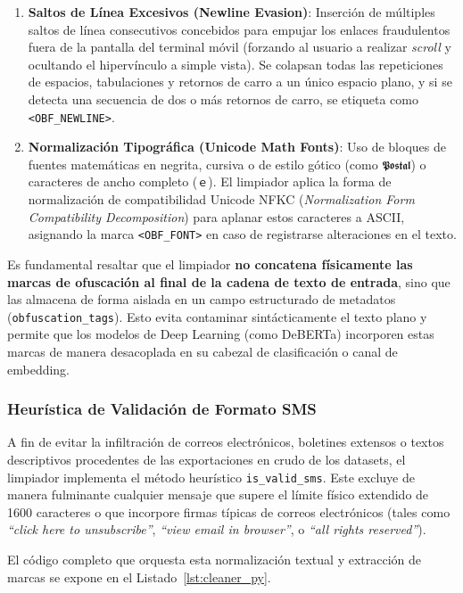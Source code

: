 \begin{enumerate}
    \item \textbf{Saltos de Línea Excesivos (Newline Evasion)}: Inserción de múltiples saltos de línea consecutivos concebidos para empujar los enlaces fraudulentos fuera de la pantalla del terminal móvil (forzando al usuario a realizar \textit{scroll} y ocultando el hipervínculo a simple vista). Se colapsan todas las repeticiones de espacios, tabulaciones y retornos de carro a un único espacio plano, y si se detecta una secuencia de dos o más retornos de carro, se etiqueta como \texttt{<OBF\_NEWLINE>}.
    \item \textbf{Normalización Tipográfica (Unicode Math Fonts)}: Uso de bloques de fuentes matemáticas en negrita, cursiva o de estilo gótico (como \texttt{𝕻𝖔𝖘𝖙𝖆𝖑}) o caracteres de ancho completo (\texttt{ｅ}). El limpiador aplica la forma de normalización de compatibilidad Unicode NFKC (\textit{Normalization Form Compatibility Decomposition}) para aplanar estos caracteres a ASCII, asignando la marca \texttt{<OBF\_FONT>} en caso de registrarse alteraciones en el texto.
\end{enumerate}

Es fundamental resaltar que el limpiador \textbf{no concatena físicamente las marcas de ofuscación al final de la cadena de texto de entrada}, sino que las almacena de forma aislada en un campo estructurado de metadatos (\texttt{obfuscation\_tags}). Esto evita contaminar sintácticamente el texto plano y permite que los modelos de Deep Learning (como DeBERTa) incorporen estas marcas de manera desacoplada en su cabezal de clasificación o canal de embedding.

\subsubsection{Heurística de Validación de Formato SMS}
A fin de evitar la infiltración de correos electrónicos, boletines extensos o textos descriptivos procedentes de las exportaciones en crudo de los datasets, el limpiador implementa el método heurístico \texttt{is\_valid\_sms}. Este excluye de manera fulminante cualquier mensaje que supere el límite físico extendido de 1600 caracteres o que incorpore firmas típicas de correos electrónicos (tales como \textit{``click here to unsubscribe''}, \textit{``view email in browser''}, o \textit{``all rights reserved''}).

El código completo que orquesta esta normalización textual y extracción de marcas se expone en el Listado~\ref{lst:cleaner_py}.

